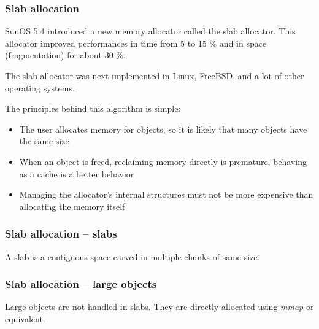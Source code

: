 
\begin{frame}
  \frametitle{Slab allocation}

  SunOS 5.4 introduced a new memory allocator called the slab
  allocator. This allocator improved performances in time from 5 to 15
  \% and in space (fragmentation) for about 30 \%.

  \-

  The slab allocator was next implemented in Linux, FreeBSD, and a lot
  of other operating systems.

  \-

  The principles behind this algorithm is simple:

  \begin{itemize}
  \item
    The user allocates memory for objects, so it is likely that many
    objects have the same size
  \item
    When an object is freed, reclaiming memory directly is premature,
    behaving as a cache is a better behavior
  \item
    Managing the allocator's internal structures must not be more
    expensive than allocating the memory itself
  \end{itemize}

\end{frame}


\begin{frame}
  \frametitle{Slab allocation -- slabs}

  A slab is a contiguous space carved in multiple chunks of same size.

  \begin{center}
  \end{center}

\end{frame}


\begin{frame}
  \frametitle{Slab allocation -- large objects}

  Large objects are not handled in slabs. They are directly allocated
  using \emph{mmap} or equivalent.

\end{frame}


